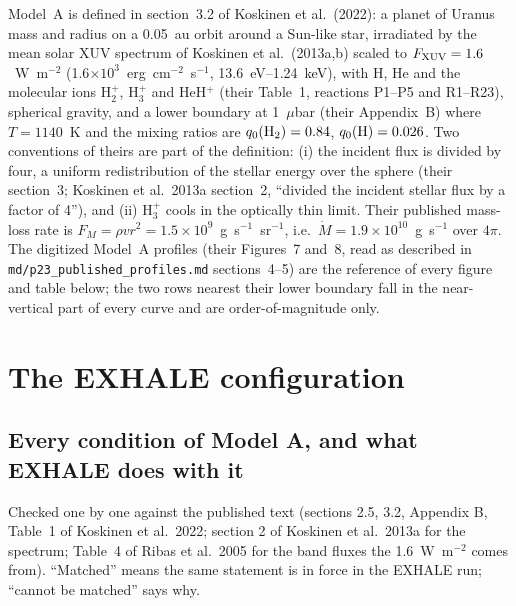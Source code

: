 \documentclass[english,a4paper]{my_memo}
\begin{document}
Model~A is defined in section~3.2 of Koskinen et al.\ (2022): a planet of
Uranus mass and radius on a 0.05~au orbit around a Sun-like star, irradiated
by the mean solar XUV spectrum of Koskinen et al.\ (2013a,b) scaled to
$F_{\rm XUV} = 1.6$~W~m$^{-2}$ (1.6$\times10^3$~erg~cm$^{-2}$~s$^{-1}$,
13.6~eV--1.24~keV), with H, He and the molecular ions H$_2^+$, H$_3^+$ and
HeH$^+$ (their Table~1, reactions P1--P5 and R1--R23), spherical gravity, and
a lower boundary at 1~$\mu$bar (their Appendix~B) where $T = 1140$~K and the
mixing ratios are $q_0({\rm H}_2) = 0.84$, $q_0({\rm H}) = 0.026$. Two
conventions of theirs are part of the definition: (i) the incident flux is
divided by four, a uniform redistribution of the stellar energy over the
sphere (their section~3; Koskinen et al.\ 2013a section~2, ``divided the
incident stellar flux by a factor of 4''), and (ii) H$_3^+$ cools in the
optically thin limit. Their published mass-loss rate is
$F_M = \rho v r^2 = 1.5\times10^9$~g~s$^{-1}$~sr$^{-1}$, i.e.\
$\dot M = 1.9\times10^{10}$~g~s$^{-1}$ over $4\pi$. The digitized Model~A
profiles (their Figures~7 and~8, read as described in
\texttt{md/p23\_published\_profiles.md} sections~4--5) are the reference
of every figure and table below; the two rows nearest their lower boundary
fall in the near-vertical part of every curve and are order-of-magnitude
only.

\section{The EXHALE configuration}

\subsection{Every condition of Model A, and what EXHALE does with it}
\label{sec:inputs}

Checked one by one against the published text (sections 2.5, 3.2, Appendix B,
Table~1 of Koskinen et al.\ 2022; section 2 of Koskinen et al.\ 2013a for the
spectrum; Table~4 of Ribas et al.\ 2005 for the band fluxes the 1.6~W~m$^{-2}$
comes from). ``Matched'' means the same statement is in force in the EXHALE
run; ``cannot be matched'' says why.
\end{document}
